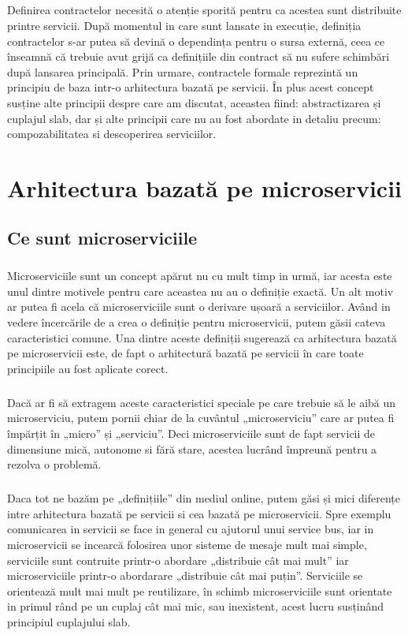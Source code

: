\documentclass[12pt]{report}
\begin{document}
  	\paragraph{}Definirea contractelor necesită o atenție sporită pentru ca acestea sunt distribuite printre servicii. După momentul in care sunt lansate in execuție, definiția contractelor s-ar putea să devină o dependința pentru o sursa externă, ceea ce înseamnă că trebuie avut grijă ca definițiile din contract să nu sufere schimbări după lansarea principală. Prin urmare, contractele formale reprezintă un principiu de baza intr-o arhitectura bazată pe servicii. În plus acest concept susține alte principii despre care am discutat, aceastea fiind: abstractizarea și cuplajul slab, dar și alte principii care nu au fost abordate in detaliu precum: compozabilitatea si descoperirea serviciilor. \cite{erl2}
\chapter{Arhitectura bazată pe microservicii}
	\section{Ce sunt microserviciile}
	\paragraph{}Microserviciile sunt un concept apărut nu cu mult timp in urmă, iar acesta este unul dintre motivele pentru care aceastea nu au o definiție exactă. Un alt motiv ar putea fi acela că microserviciile sunt o derivare ușoară a serviciilor. Având in vedere încercările de a crea o definiție pentru microservicii, putem găsii cateva caracteristici comune. Una dintre aceste definiții sugerează ca arhitectura bazată pe microservicii este, de fapt o arhitectură bazată pe servicii în care toate principiile au fost aplicate corect. \cite{fowler1}
	\paragraph{}Dacă ar fi să extragem aceste caracteristici speciale pe care trebuie să le aibă un microserviciu, putem pornii chiar de la cuvântul „microserviciu” care ar putea fi împărțit în „micro” și „serviciu”. Deci microserviciile sunt de fapt servicii de dimensiune mică, autonome si fără stare, acestea lucrând împreună pentru a rezolva o problemă. 
	\paragraph{}Daca tot ne bazăm pe „definițiile” din mediul online, putem găsi și mici diferențe intre arhitectura bazată pe servicii si cea bazată pe microservicii. Spre exemplu comunicarea in servicii se face in general cu ajutorul unui service bus, iar in microservicii se incearcă folosirea unor sisteme de mesaje mult mai simple, serviciile sunt contruite printr-o abordare „distribuie cât mai mult” iar microserviciile printr-o abordarare „distribuie cât mai puțin”. Serviciile se orientează mult mai mult pe reutilizare, în schimb microserviciile sunt orientate in primul rând pe un cuplaj cât mai mic, sau inexistent, acest lucru susținând principiul cuplajului slab.
\end{document}
